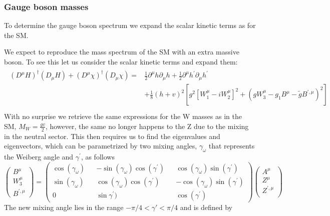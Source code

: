 \documentclass[12pt]{article}
\begin{document}
\subsubsection{Gauge boson masses}

To determine the gauge boson spectrum we expand the scalar kinetic terms as for the SM. 

We expect to reproduce the mass spectrum of the SM with an extra massive boson. To see this let us consider the scalar kinetic terms and expand them:
%
\begin{align}
\begin{split}
(D^\mu H)^\dagger (D_\mu H) + (D^\mu \chi)^\dagger (D_\mu \chi)  = & \frac{1}{2} \partial^\mu h \partial_\mu h 	+ \frac{1}{2} \partial^\mu h^\prime \partial_\mu h^\prime \\ & + \frac{1}{8} (h+v)^2 \left[ g^2 [W_1^\mu - i W_2^\mu ]^2 + \left( gW^\mu_3 - g_1B^\mu - \tilde{g} B^{\prime ,\mu}\right)^2   \right] \\  & 	
\end{split}
\end{align}
%
With no surprise we retrieve the same expressions for the W masses as in the SM, $M_W= \frac{gv}{2}$, however, the same no longer happens to the Z due to the mixing in the neutral sector. This then requires us to find the eigenvalues and eigenvectors, which can be parametrized by two mixing angles, $\gamma_\omega$ that represents the Weiberg angle and $\gamma^\prime$, as follows
%
\begin{equation}
\begin{pmatrix}
B^\mu \\
W_3^\mu \\
B^{\prime, \mu}
\end{pmatrix}=\begin{pmatrix}
\cos(\gamma_\omega) && -\sin(\gamma_\omega) \cos(\gamma^\prime) && \cos(\gamma_\omega) \sin(\gamma^\prime) \\ 
\sin(\gamma_\omega) && \cos(\gamma_\omega) \cos(\gamma^\prime) && -\cos(\gamma_\omega) \sin(\gamma^\prime) \\ 
0 && \sin\gamma^\prime) && \cos(\gamma^\prime)
\end{pmatrix} \begin{pmatrix}
 A^\mu \\ 
 Z^\mu \\
 Z^{\prime,\mu} \\
\end{pmatrix}
\label{niceboi}
\end{equation}
%
The new mixing angle lies in the range $-\pi/4 < \gamma' < \pi/4$ and is defined by
\end{document}
